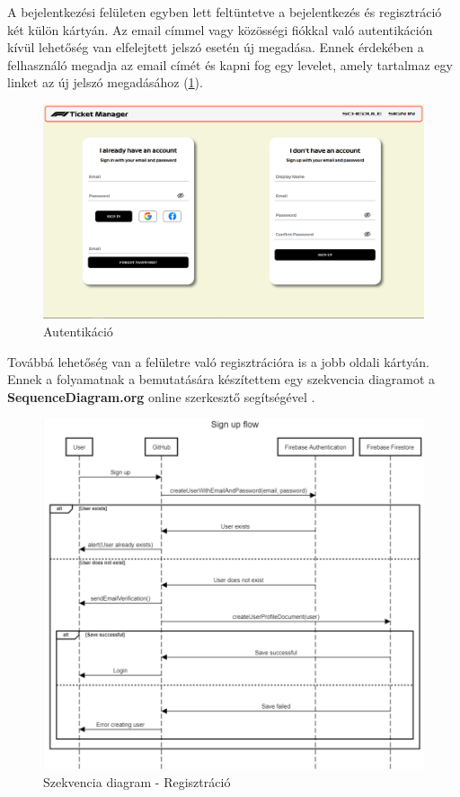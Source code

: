 A bejelentkezési felületen egyben lett feltüntetve a bejelentkezés és regisztráció két külön kártyán. Az email címmel vagy közösségi fiókkal való autentikáción kívül lehetőség van elfelejtett jelszó esetén új megadása. Ennek érdekében a felhasználó megadja az email címét és kapni fog egy levelet, amely tartalmaz egy linket az új jelszó megadásához (\ref{abra:signInUp}).

\begin{figure}[!h]
	\centering
	\includegraphics[scale=0.2]{images/signInUp}
	\caption{Autentikáció}
	\label{abra:signInUp}
\end{figure}

Továbbá lehetőség van a felületre való regisztrációra is a jobb oldali kártyán. Ennek a folyamatnak a bemutatására készítettem egy szekvencia diagramot a \textbf{SequenceDiagram.org} online szerkesztő segítségével \cite{Seq}.

\begin{figure}[!h]
	\centering
	\includegraphics[scale=0.5]{images/signUpFlow}
	\caption{Szekvencia diagram - Regisztráció}
	\label{abra:signUpFlow}
\end{figure}
\pagebreak

